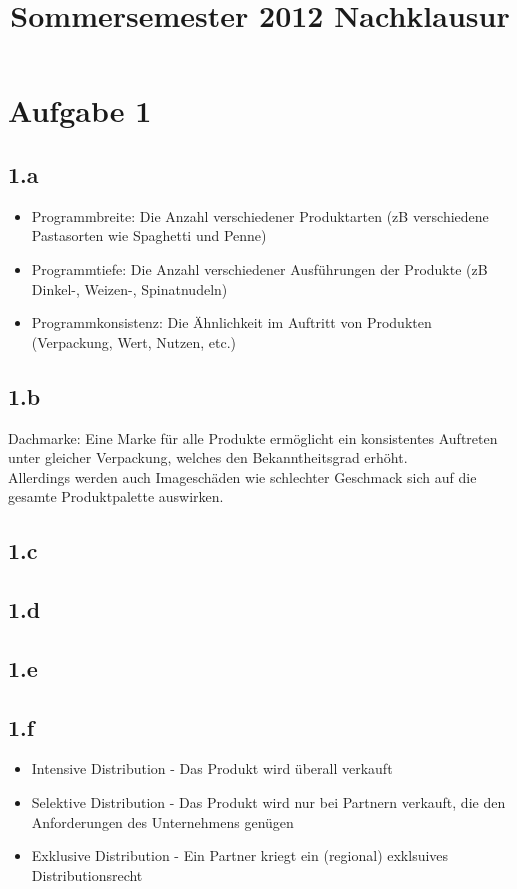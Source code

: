 

\title{Sommersemester 2012 Nachklausur}
\maketitle

\section{Aufgabe 1}
\subsection{1.a}
    \begin{itemize}
        \item Programmbreite: Die Anzahl verschiedener Produktarten (zB verschiedene Pastasorten wie Spaghetti und Penne)
        \item Programmtiefe: Die Anzahl verschiedener Ausführungen der Produkte (zB Dinkel-, Weizen-, Spinatnudeln)
        \item Programmkonsistenz: Die Ähnlichkeit im Auftritt von Produkten (Verpackung, Wert, Nutzen, etc.)
    \end{itemize}

\subsection{1.b}
    Dachmarke: Eine Marke für alle Produkte ermöglicht ein konsistentes Auftreten unter gleicher Verpackung, welches den Bekanntheitsgrad erhöht. \\
    Allerdings werden auch Imageschäden wie schlechter Geschmack sich auf die gesamte Produktpalette auswirken.

\subsection{1.c}
\subsection{1.d}
\subsection{1.e}
\subsection{1.f}
    \begin{itemize}
        \item Intensive Distribution - Das Produkt wird überall verkauft
        \item Selektive Distribution - Das Produkt wird nur bei Partnern verkauft, die den Anforderungen des Unternehmens genügen
        \item Exklusive Distribution - Ein Partner kriegt ein (regional) exklsuives Distributionsrecht
    \end{itemize}

